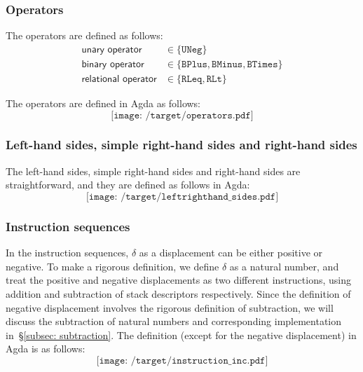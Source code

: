 \documentclass[12pt,a4paper]{report}
\theoremstyle{definition}
\newcommand{\secref}[1]{\S\ref{#1}}
\begin{document}
    \subsubsection{Operators}
    The operators are defined as follows:
    \[\begin{aligned}
        \textsf{unary operator} &\in \{\texttt{UNeg}\} \\
        \textsf{binary operator} &\in \{\texttt{BPlus}, \texttt{BMinus}, \texttt{BTimes}\} \\
        \textsf{relational operator} &\in \{\texttt{RLeq}, \texttt{RLt}\}
    \end{aligned}\]

    The operators are defined in Agda as follows:
    \[\texttt{[image: /target/operators.pdf]}\]

    \subsubsection{Left-hand sides, simple right-hand sides and right-hand sides}
    The left-hand sides, simple right-hand sides and right-hand sides are straightforward, and they are defined as follows in Agda:
    \[\texttt{[image: /target/leftrighthand\_sides.pdf]}\]

    \subsubsection{Instruction sequences}
    In the instruction sequences, $\delta$ as a displacement can be either positive or negative. To make a rigorous definition, we define $\delta$ as a natural number, and treat the positive and negative displacements as two different instructions, using addition and subtraction of stack descriptors respectively. Since the definition of negative displacement involves the rigorous definition of subtraction, we will discuss the subtraction of natural numbers and corresponding implementation in~\secref{subsec: subtraction}. The definition (except for the negative displacement) in Agda is as follows:
    \[\texttt{[image: /target/instruction\_inc.pdf]}\]
\end{document}
